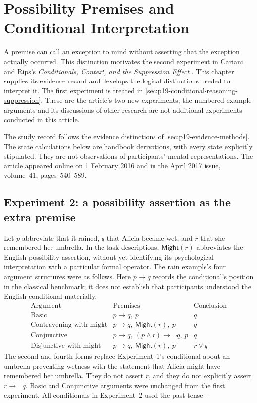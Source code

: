 \chapter{Possibility Premises and Conditional Interpretation}
\label{sec:p19-conditional-interpretation-experiments}

A premise can call an exception to mind without asserting that the exception
actually occurred. This distinction motivates the second experiment in
Cariani and Rips's \emph{Conditionals, Context, and the Suppression Effect}
\cite[Secs.~2.3, 5.4]{CarianiRips2017Suppression}. This chapter supplies its
evidence record and develops the logical distinctions needed to interpret it.
The first experiment is treated in
\cref{sec:p19-conditional-reasoning-suppression}. These are the article's two
new experiments; the numbered example arguments and its discussions of other
research are not additional experiments conducted in this article.

The study record follows the evidence distinctions of
\cref{sec:p19-evidence-methods}. The state calculations below are handbook
derivations, with every state explicitly stipulated. They are not observations
of participants' mental representations. The article appeared online on
1 February 2016 and in the April 2017 issue, volume~41, pages~540--589.

\section{Experiment 2: a possibility assertion as the extra premise}
\label{sec:p19-cariani-rips-experiment-two}

Let \(p\) abbreviate that it rained, \(q\) that Alicia became wet, and \(r\)
that she remembered her umbrella. In the task descriptions,
\(\mathsf{Might}(r)\) abbreviates the English possibility assertion, without
yet identifying its psychological interpretation with a particular formal
operator. The rain example's four argument structures were as follows.
Here \(p\to q\) records the conditional's position in the classical benchmark;
it does not establish that participants understood the English conditional
materially.
\[
\begin{array}{c|l|c}
\text{Argument}&\text{Premises}&\text{Conclusion}\\\hline
\text{Basic}&p\to q,\ p&q\\
\text{Contravening with might}&p\to q,\ \mathsf{Might}(r),\ p&q\\
\text{Conjunctive}&p\to q,\ (p\land r)\to\neg q,\ p&q\\
\text{Disjunctive with might}&p\to q,\ \mathsf{Might}(r),\ p&r\lor q
\end{array}
\]
The second and fourth forms replace Experiment~1's conditional about an
umbrella preventing wetness with the statement that Alicia might have
remembered her umbrella. They do not assert \(r\), and they do not explicitly
assert \(r\to\neg q\). Basic and Conjunctive arguments were unchanged from
the first experiment. All conditionals in Experiment~2 used the past tense
\cite[Sec.~2.3]{CarianiRips2017Suppression}.

